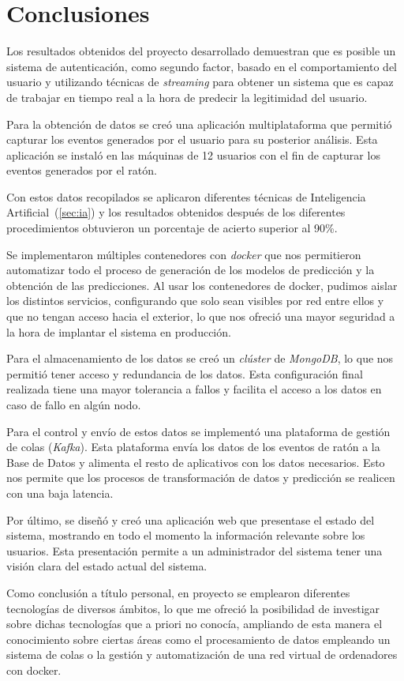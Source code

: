 \chapter{Conclusiones}
\label{sec:conclusion}

Los resultados obtenidos del proyecto desarrollado demuestran que es posible un sistema de autenticación, como segundo factor, basado en el comportamiento del usuario y utilizando técnicas de \textit{streaming} para obtener un sistema que es capaz de trabajar en tiempo real a la hora de predecir la legitimidad del usuario.

Para la obtención de datos se creó una aplicación multiplataforma que permitió capturar los eventos generados por el usuario para su posterior análisis. Esta aplicación se instaló en las máquinas de 12 usuarios con el fin de capturar los eventos generados por el ratón.

Con estos datos recopilados se aplicaron diferentes técnicas de Inteligencia Artificial~(\cref{sec:ia}) y los resultados obtenidos después de los diferentes procedimientos obtuvieron un porcentaje de acierto superior al 90\%.

Se implementaron múltiples contenedores con \textit{docker} que nos permitieron automatizar todo el proceso de generación de los modelos de predicción y la obtención de las predicciones. Al usar los contenedores de docker, pudimos aislar los distintos servicios, configurando que solo sean visibles por red entre ellos y que no tengan acceso hacia el exterior, lo que nos ofreció una mayor seguridad a la hora de implantar el sistema en producción.

Para el almacenamiento de los datos se creó un \textit{clúster} de \textit{MongoDB}, lo que nos permitió tener acceso y  redundancia de los datos. Esta configuración final realizada tiene una mayor tolerancia a fallos y facilita el acceso a los datos en caso de fallo en algún nodo.

Para el control y envío de estos datos se implementó una plataforma de gestión de colas (\textit{Kafka}). Esta plataforma envía los datos de los eventos de ratón a la Base de Datos y alimenta el resto de aplicativos con los datos necesarios. Esto nos permite que los procesos de transformación de datos y predicción se realicen con una baja latencia.

Por último, se diseñó y creó una aplicación web que presentase el estado del sistema, mostrando en todo el momento la información relevante sobre los usuarios. Esta presentación permite a un administrador del sistema tener una visión clara del estado actual del sistema.

Como conclusión a título personal, en proyecto se emplearon diferentes tecnologías de diversos ámbitos, lo que me ofreció la posibilidad de investigar sobre dichas tecnologías que a priori no conocía, ampliando de esta manera el conocimiento sobre ciertas áreas como el procesamiento de datos empleando un sistema de colas o la gestión y automatización de una red virtual de ordenadores con docker. 



